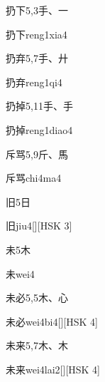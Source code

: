 \begin{entry}{扔下}{5,3}{⼿、⼀}
  \begin{phonetics}{扔下}{reng1xia4}
  \end{phonetics}
\end{entry}

\begin{entry}{扔弃}{5,7}{⼿、⼶}
  \begin{phonetics}{扔弃}{reng1qi4}
  \end{phonetics}
\end{entry}

\begin{entry}{扔掉}{5,11}{⼿、⼿}
  \begin{phonetics}{扔掉}{reng1diao4}
  \end{phonetics}
\end{entry}

\begin{entry}{斥骂}{5,9}{⽄、⾺}
  \begin{phonetics}{斥骂}{chi4ma4}
  \end{phonetics}
\end{entry}

\begin{entry}{旧}{5}{⽇}
  \begin{phonetics}{旧}{jiu4}[][HSK 3]
  \end{phonetics}
\end{entry}

\begin{entry}{未}{5}{⽊}
  \begin{phonetics}{未}{wei4}
  \end{phonetics}
\end{entry}

\begin{entry}{未必}{5,5}{⽊、⼼}
  \begin{phonetics}{未必}{wei4bi4}[][HSK 4]
  \end{phonetics}
\end{entry}

\begin{entry}{未来}{5,7}{⽊、⽊}
  \begin{phonetics}{未来}{wei4lai2}[][HSK 4]
  \end{phonetics}
\end{entry}

